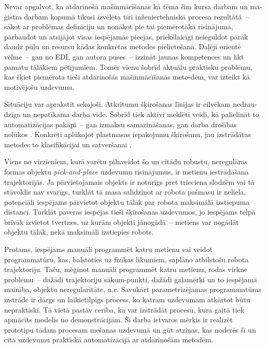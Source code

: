 \documentclass[12pt, a4paper]{article}
\numberwithin{equation}{section} %
\begin{document}
Nevar apgalvot, ka atdarinošā mašīnmācīšanās kā tēma šim kursa darbam un ma-ģistra darbam kopumā tikusi izvēlēta tīri inženiertehniskā procesa rezultātā~-- sākot ar problēmas definīciju un nonākot pie tai piemērotākā risinājuma, pārbaudot un atsijājot visas iespējamās pieejas, priekšlaicīgi neieguldot pārāk daudz pūļu un resursu kādas konkrētas metodes pielietošanā. Daļēji orientē vēlme~-- gan no EDI, gan autora puses~-- izzināt jaunas kompetences un likt pamatu tālākiem pētījumiem. Tomēr vienu šobrīd aktuālu praktisku problēmu, kas šķiet piemērota tieši atdarinošās mašīnmācīšanās meto-dēm, var izteikt kā motivējošu uzdevumu. 

Situāciju var aprakstīt sekojoši. Atkritumu šķirošanas līnijas ir cilvēkam nedrau-dzīga un nepatīkama darba vide. Šobrīd tiek aktīvi meklēti veidi, kā palielināt to automatizācijas pakāpi~-- gan izmaksu samazināšanas, gan darba drošības nolūkos \cite{trashbot}. Konkrēti aplūkojot plastmasas iepakojumu šķirošanu, jau izstrādātas metodes to klasifikācijai un satveršanai \cite{trashbot}. 

Viens no virzieniem, kurā varētu pilnveidot šo un citādu robustu, neregulāras formas objektu \textit{pick-and-place} uzdevumu risinājumus, ir metienu iestrādāšana trajektorijās. Ja pārvietojamais objekts ir noturīgs pret trieciena slodzēm vai tā stāvoklis nav svarīgs, turklāt tā masa salīdzinot ar robota pašmasu ir neliela, potenciāli iespējams pārvietot objektu tālāk par robota maksimālā izstiepuma distanci. Turklāt paveras iespējas tieši šķirošanas uzdevumos, jo iespējams telpā brīvāk izvietot tvertnes, uz kurām objekti jānogādā~-- metiens var nogādāt objektu tālāk, nekā maksimāli izstiepies robots. 

Protams, iespējams manuāli programmēt katru metienu vai veidot programmatūru, kas, balstoties uz fizikas likumiem, saplāno atbilstošu robota trajektoriju. Taču, mēģinot manuāli programmēt katru metienu, rodas virkne problēmu~-- dažādi trajektoriju sākum-punkti, dažādi galamērķi un to iespējamā mainība, objektu neregularitāte, u.c. Savukārt parametrizējamas programmatūras izstrāde ir dārgs un laikietilpīgs process, ko katram uzdevumam atkārtot būtu nepraktiski. Tā vietā pastāv cerība, ka var izstrādāt procesu, kura gaitā tiek apmācīts modelis no demonstrācijām. Šī darba ietvaros mērķis ir realizēt prototipu tādam procesam mešanas uzdevumā un gūt atziņas, kas noderēs šī un cita uzdevumu praktiskā automatizācijā ar atdarinošām metodēm.

%
%
%
%
%
%
%
%
%
%
%
%
%
%
%
%
%
%
%
\end{document}
